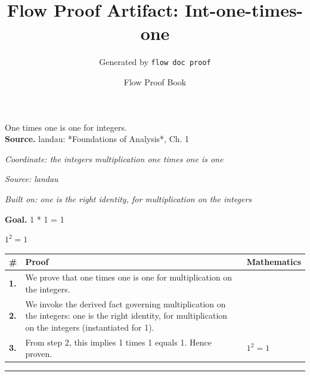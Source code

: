 \documentclass[11pt]{article}
\title{Flow Proof Artifact: Int-one-times-one}
\author{Generated by \texttt{flow doc proof}}
\date{Flow Proof Book}
\theoremstyle{definition}
\begin{document}
\maketitle
One times one is one for integers.\\[0.5em]
\textbf{Source.} landau: *Foundations of Analysis*, Ch. 1\\[0.5em]
\bigskip
{}\par
\smallskip\noindent\textit{Coordinate: the integers \cdot multiplication \cdot one times one is one}\par
\smallskip\noindent\textit{Source: landau}\par
\smallskip\noindent\textit{Built on: one is the right identity, for multiplication on the integers}\par
\medskip
\noindent\textbf{Goal.} 1 * 1 = 1\par
\noindent$\displaystyle 1^{2} = 1$\par
\medskip
\noindent
\begin{tabular}{@{} >{\raggedright\arraybackslash}p{} >{\raggedright\arraybackslash}p{} >{\raggedleft\arraybackslash}p{} @{}}
\textbf{\#} & \textbf{Proof} & \textbf{Mathematics} \\
\midrule
\textbf{1.} & We prove that one times one is one for multiplication on the integers. & \\[0.45em]
\textbf{2.} & We invoke the derived fact governing multiplication on the integers: one is the right identity, for multiplication on the integers (instantiated for 1). & \\[0.45em]
\textbf{3.} & From step 2, this implies 1 times 1 equals 1. Hence proven. & $\displaystyle 1^{2} = 1$ \\[0.45em]
\bottomrule
\end{tabular}
\label{thm:Int-multiplication-one_times_one_is_one}
\par\medskip\hrule
\end{document}
